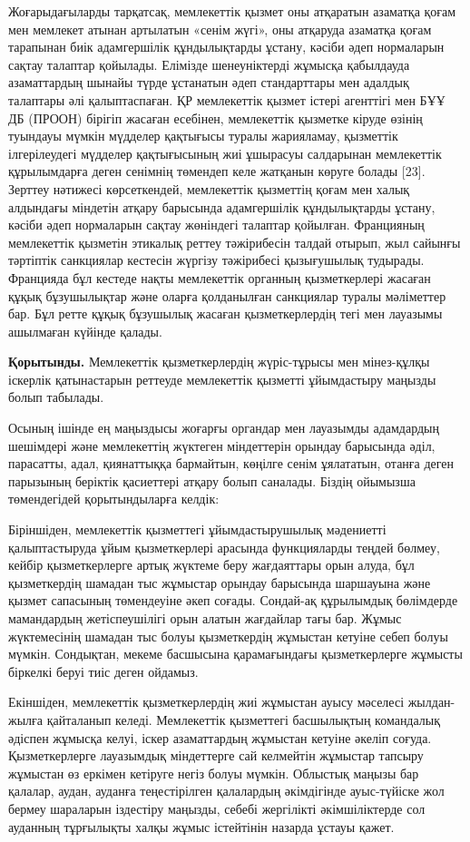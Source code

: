 \begin{multicols}{2}
Жоғарыдағыларды тарқатсақ, мемлекеттік қызмет оны атқаратын азаматқа
қоғам мен мемлекет атынан артылатын «сенім жүгі», оны атқаруда азаматқа
қоғам тарапынан биік адамгершілік құндылықтарды ұстану, кәсіби әдеп
нормаларын сақтау талаптар қойылады. Елімізде шенеуніктерді жұмысқа
қабылдауда азаматтардың шынайы түрде ұстанатын әдеп стандарттары мен
адалдық талаптары әлі қалыптаспаған. ҚР мемлекеттік қызмет істері
агенттігі мен БҰҰ ДБ (ПРООН) бірігіп жасаған есебінен, мемлекеттік
қызметке кіруде өзінің туындауы мүмкін мүдделер қақтығысы туралы
жарияламау, қызметтік ілгерілеудегі мүдделер қақтығысының жиі ұшырасуы
салдарынан мемлекеттік құрылымдарға деген сенімнің төмендеп келе
жатқанын көруге болады {[}23{]}. Зерттеу нәтижесі көрсеткендей,
мемлекеттік қызметтің қоғам мен халық алдындағы міндетін атқару
барысында адамгершілік құндылықтарды ұстану, кәсіби әдеп нормаларын
сақтау жөніндегі талаптар қойылған. Францияның мемлекеттік қызметін
этикалық реттеу тәжірибесін талдай отырып, жыл сайынғы тәртіптік
санкциялар кестесін жүргізу тәжірибесі қызығушылық тудырады. Францияда
бұл кестеде нақты мемлекеттік органның қызметкерлері жасаған құқық
бұзушылықтар және оларға қолданылған санкциялар туралы мәліметтер бар.
Бұл ретте құқық бұзушылық жасаған қызметкерлердің тегі мен лауазымы
ашылмаған күйінде қалады.

{\bfseries Қорытынды.} Мемлекеттік қызметкерлердің жүріс-тұрысы мен
мінез-құлқы іскерлік қатынастарын реттеуде мемлекеттік қызметті
ұйымдастыру маңызды болып табылады.

Осының ішінде ең маңыздысы жоғарғы органдар мен лауазымды адамдардың
шешімдері және мемлекеттің жүктеген міндеттерін орындау барысында әділ,
парасатты, адал, қиянаттыққа бармайтын, көңілге сенім ұялататын, отанға
деген парызының беріктік қасиеттері атқару болып саналады. Біздің
ойымызша төмендегідей қорытындыларға келдік:

Біріншіден, мемлекеттік қызметтегі ұйымдастырушылық мәдениетті
қалыптастыруда ұйым қызметкерлері арасында функцияларды теңдей бөлмеу,
кейбір қызметкерлерге артық жүктеме беру жағдаяттары орын алуда, бұл
қызметкердің шамадан тыс жұмыстар орындау барысында шаршауына және
қызмет сапасының төмендеуіне әкеп соғады. Сондай-ақ құрылымдық
бөлімдерде мамандардың жетіспеушілігі орын алатын жағдайлар тағы бар.
Жұмыс жүктемесінің шамадан тыс болуы қызметкердің жұмыстан кетуіне себеп
болуы мүмкін. Сондықтан, мекеме басшысына қарамағындағы қызметкерлерге
жұмысты біркелкі беруі тиіс деген ойдамыз.

Екіншіден, мемлекеттік қызметкерлердің жиі жұмыстан ауысу мәселесі
жылдан-жылға қайталанып келеді. Мемлекеттік қызметтегі басшылықтың
командалық әдіспен жұмысқа келуі, іскер азаматтардың жұмыстан кетуіне
әкеліп соғуда. Қызметкерлерге лауазымдық міндеттерге сай келмейтін
жұмыстар тапсыру жұмыстан өз еркімен кетіруге негіз болуы мүмкін.
Облыстық маңызы бар қалалар, аудан, ауданға теңестірілген қалалардың
әкімдігінде ауыс-түйіске жол бермеу шараларын іздестіру маңызды, себебі
жергілікті әкімшіліктерде сол ауданның тұрғылықты халқы жұмыс істейтінін
назарда ұстауы қажет.


\end{multicols}
